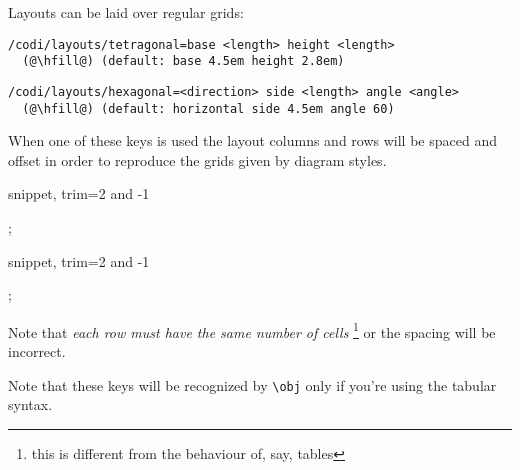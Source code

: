Layouts can be laid over regular grids:

\begin{lstlisting}
/codi/layouts/tetragonal=base <length> height <length>
  (@\hfill@) (default: base 4.5em height 2.8em)
\end{lstlisting}

\begin{lstlisting}
/codi/layouts/hexagonal=<direction> side <length> angle <angle>
  (@\hfill@) (default: horizontal side 4.5em angle 60)
\end{lstlisting}

When one of these keys is used the layout columns and rows will be
spaced and offset in order to reproduce the grids given by diagram styles.

\begin{tcblisting}{snippet, trim={2 and -1}}
\begin{codi}
  ;
\end{codi}
\end{tcblisting}

\begin{tcblisting}{snippet, trim={2 and -1}}
\begin{codi}
  ;
\end{codi}
\end{tcblisting}

Note that \emph{each row must have the same number of cells}%
\footnote{this is different from the behaviour of, say, tables}
or the spacing will be incorrect.

Note that these keys will be recognized by \lstinline|\obj| only if you're using the tabular syntax.
